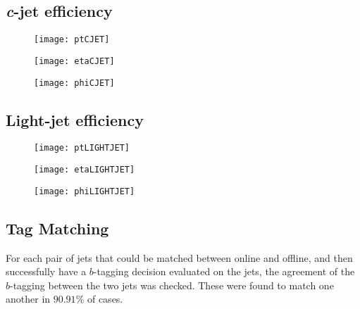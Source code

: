 	\subsection{\textit{c}-jet efficiency}

		\begin{figure}[h]
			\centering
			\begin{minipage}[h]{0.31\linewidth}
				\texttt{[image: ptCJET]}

			\end{minipage}
			\quad
			\begin{minipage}[h]{0.31\linewidth}
				\texttt{[image: etaCJET]}
			\end{minipage}
			\quad
			\begin{minipage}[h]{0.31\linewidth}
				\texttt{[image: phiCJET]}
			\end{minipage}
			\caption{ }
			\label{fig:MC:cjetefficiency}
		\end{figure}

	\newpage
	\subsection{Light-jet efficiency}

		\begin{figure}[h]
			\centering
			\begin{minipage}[h]{0.31\linewidth}
				\texttt{[image: ptLIGHTJET]}

			\end{minipage}
			\quad
			\begin{minipage}[h]{0.31\linewidth}
				\texttt{[image: etaLIGHTJET]}
			\end{minipage}
			\quad
			\begin{minipage}[h]{0.31\linewidth}
				\texttt{[image: phiLIGHTJET]}
			\end{minipage}
			\caption{ }
			\label{fig:MC:lightjetefficiency}
		\end{figure}


	\subsection{Tag Matching}

	For each pair of jets that could be matched between online and offline, and then successfully have a $b$-tagging decision evaluated on the jets, the agreement of the $b$-tagging between the two jets was checked. These were found to match one another in $90.91\%$ of cases.

